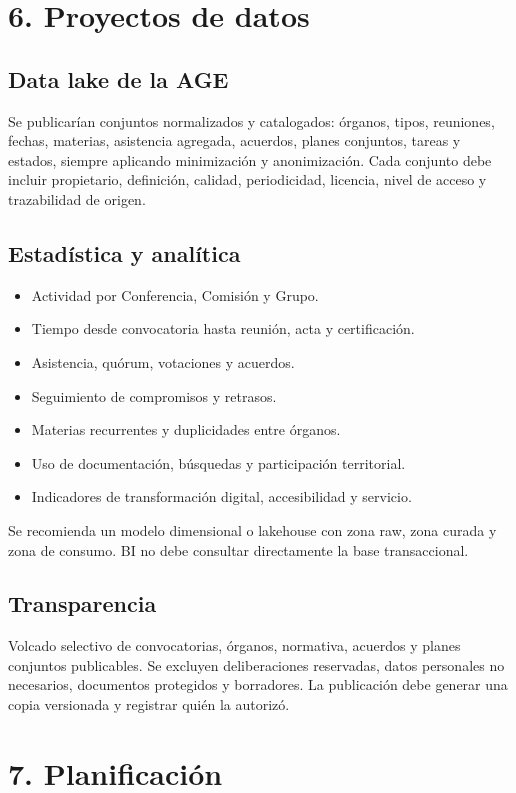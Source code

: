 \documentclass[11pt,a4paper]{article}
\begin{document}
\section{6. Proyectos de datos}

\subsection{Data lake de la AGE}
Se publicarían conjuntos normalizados y catalogados: órganos, tipos, reuniones, fechas, materias, asistencia agregada, acuerdos, planes conjuntos, tareas y estados, siempre aplicando minimización y anonimización. Cada conjunto debe incluir propietario, definición, calidad, periodicidad, licencia, nivel de acceso y trazabilidad de origen.

\subsection{Estadística y analítica}
\begin{itemize}
\item Actividad por Conferencia, Comisión y Grupo.
\item Tiempo desde convocatoria hasta reunión, acta y certificación.
\item Asistencia, quórum, votaciones y acuerdos.
\item Seguimiento de compromisos y retrasos.
\item Materias recurrentes y duplicidades entre órganos.
\item Uso de documentación, búsquedas y participación territorial.
\item Indicadores de transformación digital, accesibilidad y servicio.
\end{itemize}

Se recomienda un modelo dimensional o lakehouse con zona raw, zona curada y zona de consumo. BI no debe consultar directamente la base transaccional.

\subsection{Transparencia}
Volcado selectivo de convocatorias, órganos, normativa, acuerdos y planes conjuntos publicables. Se excluyen deliberaciones reservadas, datos personales no necesarios, documentos protegidos y borradores. La publicación debe generar una copia versionada y registrar quién la autorizó.

\section{7. Planificación}
\end{document}
